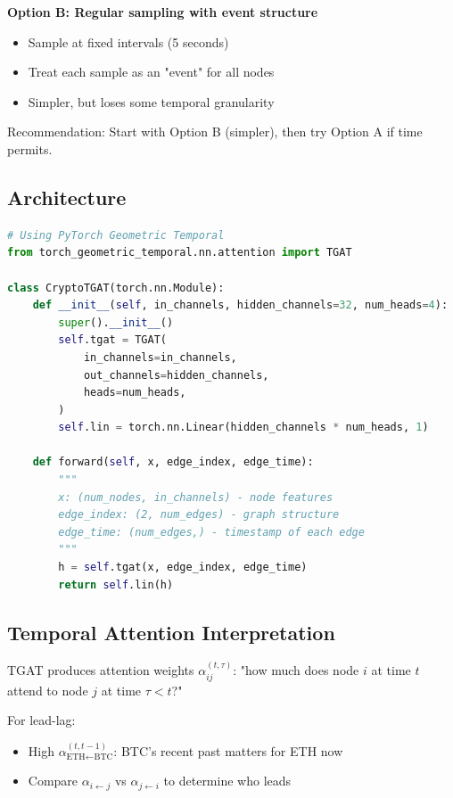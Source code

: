 \documentclass[11pt, a4paper]{article}
\begin{document}
\textbf{Option B: Regular sampling with event structure}
\begin{itemize}
    \item Sample at fixed intervals (5 seconds)
    \item Treat each sample as an "event" for all nodes
    \item Simpler, but loses some temporal granularity
\end{itemize}

Recommendation: Start with Option B (simpler), then try Option A if time permits.

\subsection{Architecture}

\begin{lstlisting}[language=Python]
# Using PyTorch Geometric Temporal
from torch_geometric_temporal.nn.attention import TGAT

class CryptoTGAT(torch.nn.Module):
    def __init__(self, in_channels, hidden_channels=32, num_heads=4):
        super().__init__()
        self.tgat = TGAT(
            in_channels=in_channels,
            out_channels=hidden_channels,
            heads=num_heads,
        )
        self.lin = torch.nn.Linear(hidden_channels * num_heads, 1)
    
    def forward(self, x, edge_index, edge_time):
        """
        x: (num_nodes, in_channels) - node features
        edge_index: (2, num_edges) - graph structure
        edge_time: (num_edges,) - timestamp of each edge
        """
        h = self.tgat(x, edge_index, edge_time)
        return self.lin(h)
\end{lstlisting}

\subsection{Temporal Attention Interpretation}

TGAT produces attention weights $\alpha_{ij}^{(t, \tau)}$: "how much does node $i$ at time $t$ attend to node $j$ at time $\tau < t$?"

For lead-lag:
\begin{itemize}
    \item High $\alpha_{\text{ETH} \leftarrow \text{BTC}}^{(t, t-1)}$: BTC's recent past matters for ETH now
    \item Compare $\alpha_{i \leftarrow j}$ vs $\alpha_{j \leftarrow i}$ to determine who leads
\end{itemize}
\end{document}
